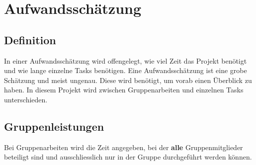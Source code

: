 \chapter{Aufwandsschätzung}\label{ch:aufwandsschatzung}
\newcommand{\trschaetzung}[3]{\rowcolor{lightgray}\textbf{#1} & \textbf{#2} \\* \multicolumn{2}{|l|}{\begin{tabular}[c]{@{}l@{}}#3\end{tabular}} \\ \hline}

\section{Definition}\label{sec:aufwandsschatzungdef}

In einer Aufwandsschätzung wird offengelegt, wie viel Zeit das Projekt benötigt und wie lange einzelne Tasks benötigen.
Eine Aufwandsschätzung ist eine grobe Schätzung und meist ungenau. Diese wird benötigt, um vorab einen Überblick zu haben.
In diesem Projekt wird zwischen Gruppenarbeiten und einzelnen Tasks unterschieden. 

\section{Gruppenleistungen}\label{sec:gruppenleistungen}

Bei Gruppenarbeiten wird die Zeit angegeben, bei der \textbf{alle} Gruppenmitglieder beteiligt sind und ausschliesslich nur in der Gruppe durchgeführt werden können. 

